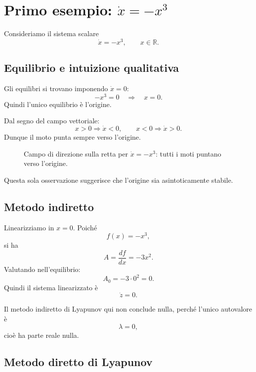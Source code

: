 \section{Primo esempio: \(\dot x=-x^3\)}

Consideriamo il sistema scalare
\[
\dot x=-x^3, \qquad x\in\mathbb{R}.
\]

\subsection{Equilibrio e intuizione qualitativa}

Gli equilibri si trovano imponendo \(\dot x=0\):
\[
-x^3=0 \quad \Longrightarrow \quad x=0.
\]
Quindi l'unico equilibrio è l'origine.

Dal segno del campo vettoriale:
\[
x>0 \Longrightarrow \dot x<0,
\qquad
x<0 \Longrightarrow \dot x>0.
\]
Dunque il moto punta sempre verso l'origine.

\begin{figure}[h!]
\centering
{}
\caption{Campo di direzione sulla retta per \(\dot x=-x^3\): tutti i moti puntano verso l'origine.}
\end{figure}

Questa sola osservazione suggerisce che l'origine sia asintoticamente stabile.

\subsection{Metodo indiretto}

Linearizziamo in \(x=0\). Poiché
\[
f(x)=-x^3,
\]
si ha
\[
A=\frac{df}{dx}=-3x^2.
\]
Valutando nell'equilibrio:
\[
A_0 = -3\cdot 0^2 = 0.
\]
Quindi il sistema linearizzato è
\[
\dot z = 0.
\]

Il metodo indiretto di Lyapunov qui non conclude nulla, perché l'unico autovalore è
\[
\lambda=0,
\]
cioè ha parte reale nulla.

\subsection{Metodo diretto di Lyapunov}

